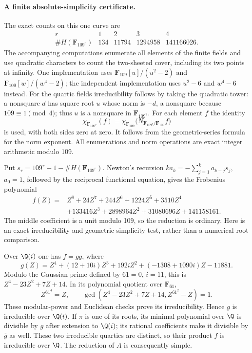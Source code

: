 \paragraph{A finite absolute-simplicity certificate.}
The exact counts on this one curve are
\[
\begin{array}{c|rrrr}
 r&1&2&3&4\\\hline
 \#H(\mathbf F_{109^r})&134&11794&1294958&141166026 .
\end{array}
 \tag{C25g}
\]
The accompanying computations enumerate all elements of
the finite fields and use quadratic characters to count
the two-sheeted cover, including its two points at infinity.
One implementation uses
$\mathbf F_{109}[u]/(u^2-2)$ and
$\mathbf F_{109}[w]/(w^4-2)$; the independent implementation
uses $u^2-6$ and $w^4-6$ instead.
For the quartic fields irreducibility follows by taking
the quadratic tower: a nonsquare $d$ has square root
$u$ whose norm is $-d$, a nonsquare because
$109\equiv1\pmod4$; thus $u$ is a nonsquare in
$\mathbf F_{109^2}$.
For each element $f$ the identity
\[
 \chi_{\mathbf F_{109^r}}(f)
  =\chi_{\mathbf F_{109}}
       \bigl(N_{\mathbf F_{109^r}/\mathbf F_{109}}f\bigr)
\]
is used, with both sides zero at zero. It follows from
the geometric-series formula for the norm exponent.
All enumerations and norm operations are exact integer
arithmetic modulo 109.

Put $s_r=109^r+1-\#H(\mathbf F_{109^r})$.
Newton's recursion
$k a_k=-\sum_{j=1}^k a_{k-j}s_j$, $a_0=1$,
followed by the reciprocal functional equation, gives
the Frobenius polynomial
\[
\begin{split}
 f(Z)={}&Z^8+24Z^7+244Z^6+1224Z^5+3510Z^4\\
       &+133416Z^3+2898964Z^2+31080696Z+141158161.
\end{split}
 \tag{C25h}
\]
The middle coefficient is a unit modulo 109, so the
reduction is ordinary. Here is an exact irreducibility
and geometric-simplicity test, rather than a numerical
root comparison.

Over $\Q(i)$ one has $f=g\overline g$, where
\[
 g(Z)=Z^4+(12+10i)Z^3+192iZ^2+(-1308+1090i)Z-11881.
 \tag{C25i}
\]
Modulo the Gaussian prime defined by $61=0$, $i=11$,
this is $Z^4-23Z^2+7Z+14$.
In its polynomial quotient over $\mathbf F_{61}$,
\[
 Z^{61^4}=Z,\qquad
 \gcd(Z^4-23Z^2+7Z+14,Z^{61^2}-Z)=1.
 \tag{C25j}
\]
These modular-power and Euclidean checks prove its
irreducibility. Hence $g$ is irreducible over $\Q(i)$.
If $\pi$ is one of its roots, its minimal polynomial over
$\Q$ is divisible by $g$ after extension to $\Q(i)$;
its rational coefficients make it divisible by
$\overline g$ as well. These two irreducible quartics are
distinct, so their product $f$ is irreducible over $\Q$.
The reduction of $A$ is consequently simple.

